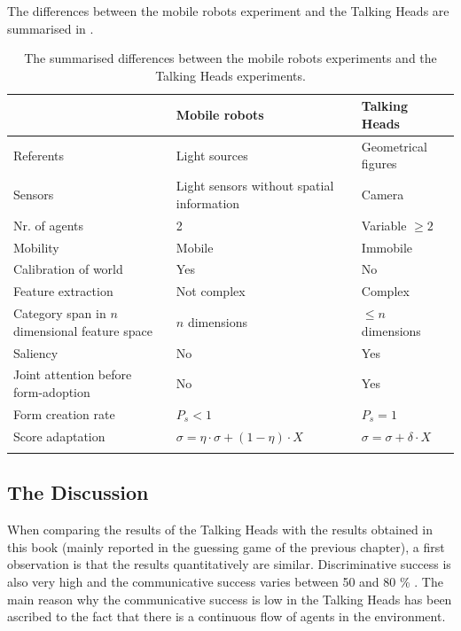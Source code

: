 The differences between the mobile robots experiment and the Talking Heads are summarised in .

\begin{table}
\centering
\begin{tabular}{>{\raggedright}p{4cm}>{\raggedright}p{4cm}l}
\lsptoprule
 & {\sc Mobile robots} & {\sc Talking Heads}\\\midrule
 Referents & Light sources & Geometrical figures\\\hline
 Sensors & Light sensors without spatial information & Camera\\\hline
 Nr. of agents & 2 & Variable $\geq 2$\\\hline
 Mobility & Mobile & Immobile\\\hline
 Calibration of world & Yes & No\\\hline
 Feature extraction & Not complex & Complex\\\hline
 Category span in $n$ dimensional feature space & $n$ dimensions & $\leq n$ dimensions\\\hline
 Saliency & No & Yes\\\hline
 Joint attention before form-adoption & No & Yes\\\hline
 Form creation rate & $P_s<1$ & $P_s=1$\\\hline
 Score adaptation & $\sigma = \eta \cdot \sigma + (1-\eta) \cdot X$ & $\sigma = \sigma + \delta \cdot X$\\%
\lspbottomrule
\end{tabular}
\caption{The summarised differences between the mobile robots experiments and the Talking Heads experiments.}
\label{t:disc:differences}
\end{table}


\subsection{The Discussion}

When comparing the results of the Talking Heads \citep{steels:2000,kaplan:2000} with the results obtained in this book (mainly reported in the guessing game of the previous chapter), a first observation is that the results quantitatively are similar. Discriminative success is also very high \citep{steels:2000} and the communicative success varies between 50 and 80 \% \citep{kaplan:2000}. The main reason why the communicative success is low in the Talking Heads has been ascribed to the fact that there is a continuous flow of agents in the environment.

